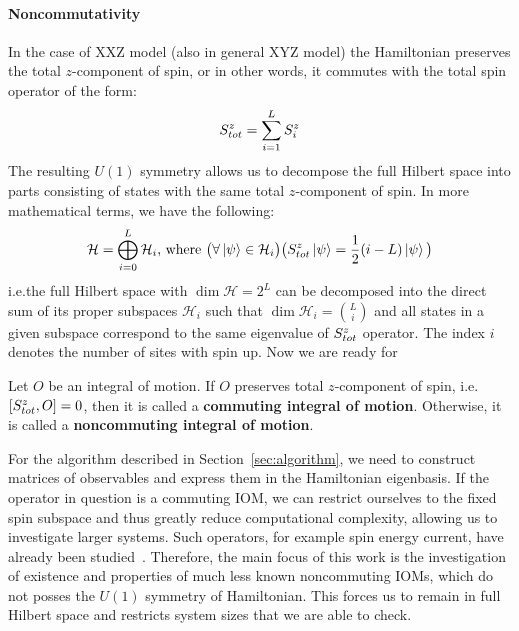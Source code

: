 \paragraph{Noncommutativity}In the case of XXZ model (also in general XYZ model) the Hamiltonian preserves the total \(z\)-component of spin,
or in other words, it commutes with the total spin operator of the form:
\begin{equation}
  S^{z}_{tot} = \sum_{i = 1}^{L} S^{z}_i
  \label{eq:magnetization}
\end{equation}
The resulting \(U(1)\) symmetry allows us to decompose the full Hilbert space into parts consisting of states with the same total \(z\)-component
of spin. In more mathematical terms, we have the following:
\begin{equation*}
  \mathcal{H} = \bigoplus_{i = 0}^{L} \mathcal{H}_i \text{, where } \big(\forall \ket{\psi} \in \mathcal{H}_i \big) \big(S^{z}_{tot} \ket{\psi} = \frac{1}{2}(i-L) \ket{\psi} \big)
\end{equation*}
i.e.\;the full Hilbert space with \(\dim{\mathcal{H}} = 2^L\) can be decomposed into the direct sum of its proper subspaces
\(\mathcal{H}_i\) such that \(\dim{\mathcal{H}_i} = \binom{L}{i}\) and all states in a given subspace correspond to the same
eigenvalue of \(S^{z}_{tot}\) operator. The index \(i\) denotes the number of sites with spin up.
Now we are ready for
\begin{definition}
  Let \(O\) be an integral of motion. If \(O\) preserves total \(z\)-component of spin, i.e.
  \(\comm{\Sz_{tot}}{O} = 0\), then it is called a \textbf{commuting integral of motion}.
  Otherwise, it is called a \textbf{noncommuting integral of motion}.\label{def:noncomm def}
\end{definition}
For the algorithm described in Section~\ref{sec:algorithm}, we need to construct matrices of
observables and express them in the Hamiltonian eigenbasis. If the operator in question is a
commuting IOM, we can restrict ourselves to the fixed spin subspace and thus greatly reduce
computational complexity, allowing us to investigate larger systems. Such operators, for example
spin energy current, have already been studied~\autocite{Mierzejewski2015Approx}. Therefore,
the main focus of this work is the investigation of existence and properties of much less known
noncommuting IOMs, which do not posses the \(U(1)\) symmetry of Hamiltonian. 
This forces us to remain in full Hilbert space and restricts system sizes that we are able to check.


